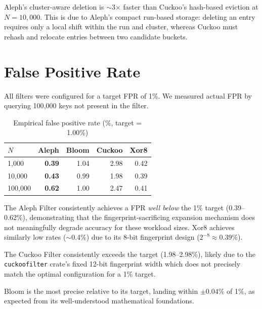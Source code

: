   \begin{insightbox}[Deletion]
    Aleph's cluster-aware deletion is $\sim$3$\times$ faster than Cuckoo's
    hash-based eviction at $N = 10{,}000$. This is due to Aleph's compact run-based
    storage: deleting an entry requires only a local shift within the run and cluster,
    whereas Cuckoo must rehash and relocate entries between two candidate buckets.
  \end{insightbox}


  \section{False Positive Rate}

  All filters were configured for a target FPR of 1\%. We measured actual FPR by
  querying 100{,}000 keys not present in the filter.

  \begin{table}[H]
    \centering
    \caption{Empirical false positive rate (\%, target = 1.00\%)}
    \label{tab:fpr}
    \begin{tabular}{l r r r r}
      \hline
      \textbf{$N$} & \textbf{Aleph} & \textbf{Bloom} & \textbf{Cuckoo} & \textbf{Xor8} \\
      \hline
      1{,}000   & \textbf{0.39} & 1.04 & 2.98 & 0.42 \\
      10{,}000  & \textbf{0.43} & 0.99 & 1.98 & 0.39 \\
      100{,}000 & \textbf{0.62} & 1.00 & 2.47 & 0.41 \\
      \hline
    \end{tabular}
  \end{table}

  \begin{insightbox}
    The Aleph Filter consistently achieves a FPR \emph{well below} the 1\% target
    (0.39--0.62\%), demonstrating that the fingerprint-sacrificing expansion mechanism
    does not meaningfully degrade accuracy for these workload sizes. Xor8 achieves
    similarly low rates ($\sim$0.4\%) due to its 8-bit fingerprint design
    ($2^{-8} \approx 0.39\%$).

    The Cuckoo Filter consistently exceeds the target (1.98--2.98\%), likely due to
    the \texttt{cuckoofilter} crate's fixed 12-bit fingerprint width which does not
    precisely match the optimal configuration for a 1\% target.

    Bloom is the most precise relative to its target, landing within $\pm 0.04\%$
    of 1\%, as expected from its well-understood mathematical foundations.
  \end{insightbox}


